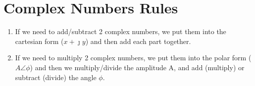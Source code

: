 \documentclass[12pt,letterpaper]{article} \usepackage{amsmath} \usepackage{graphicx} \usepackage[margin=1in]{geometry} \usepackage{longtable}  \usepackage{amssymb}
\begin{document}
	\section{Complex Numbers Rules}
	\begin{enumerate}[]
		\item If we need to add/subtract 2 complex numbers, we put them into the cartesian form ($x + \jmath y$) and then add each part together.
		\item If we need to multiply 2 complex numbers, we put them into the polar form ($A\angle \phi$) and then we multiply/divide the amplitude A, and add (multiply) or subtract (divide) the angle $\phi$.
	\end{enumerate}
	
	
	
	
\end{document}
